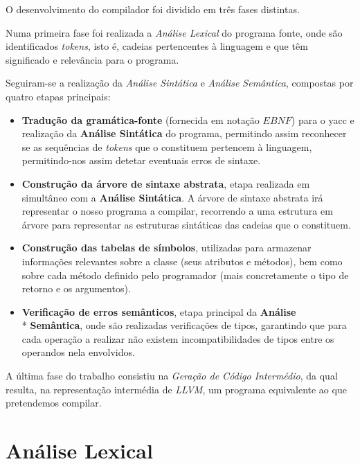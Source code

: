 \documentclass[11pt,a4paper]{article}
\begin{document}
O desenvolvimento do compilador foi dividido em três fases distintas.

Numa primeira fase foi realizada a \emph{Análise Lexical} do programa fonte, onde são identificados \emph{tokens}, isto é, cadeias pertencentes à linguagem e que têm significado e relevância para o programa.

Seguiram-se a realização da \emph{Análise Sintática} e \emph{Análise Semântica}, compostas por quatro etapas principais:

\begin{itemize}
\item \textbf{Tradução da gramática-fonte} (fornecida em notação $EBNF$) para o yacc e realização da \textbf{Análise Sintática} do programa, permitindo assim reconhecer se as sequências de \emph{tokens} que o constituem pertencem à linguagem, permitindo-nos assim detetar eventuais erros de sintaxe.

\item \textbf{Construção da árvore de sintaxe abstrata}, etapa realizada em simultâneo com a \textbf{Análise Sintática}. A árvore de sintaxe abstrata irá representar o nosso programa a compilar, recorrendo a uma estrutura em árvore para representar as estruturas sintáticas das cadeias que o constituem.

\item \textbf{Construção das tabelas de símbolos}, utilizadas para armazenar informações relevantes sobre a classe (seus atributos e métodos), bem como sobre cada método definido pelo programador (mais concretamente o tipo de retorno e os argumentos).

\item \textbf{Verificação de erros semânticos}, etapa principal da \textbf{Análise} \\* \textbf{Semântica}, onde são realizadas verificações de tipos, garantindo que para cada operação a realizar não existem incompatibilidades de tipos entre os operandos nela envolvidos.

\end{itemize}

A última fase do trabalho consistiu na \emph{Geração de Código Intermédio}, da qual resulta, na representação intermédia de \emph{LLVM}, um programa equivalente ao que pretendemos compilar.

\pagebreak

\section{Análise Lexical}
\end{document}
